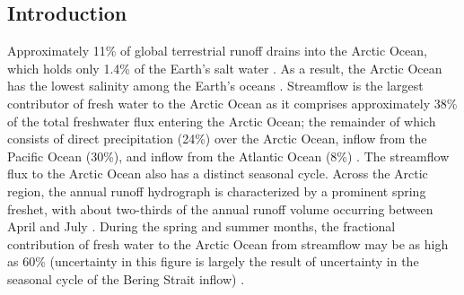 \documentclass[jgrga, draft]{agutex}
\begin{document}
%
%

%

\begin{article}

%
%

\section{Introduction}
\label{sec:intro}
Approximately 11\% of global terrestrial runoff drains into the Arctic Ocean, which holds only 1.4\% of the Earth's salt water \citep{Lewis_2000,Lammers_2001}.
As a result, the Arctic Ocean has the lowest salinity among the Earth's oceans \citep[e.g.][]{Steele_2001}.
Streamflow is the largest contributor of fresh water to the Arctic Ocean as it comprises approximately 38\% of the total freshwater flux entering the Arctic Ocean; the remainder of which consists of direct precipitation (24\%) over the Arctic Ocean, inflow from the Pacific Ocean (30\%), and inflow from the Atlantic Ocean (8\%) \citep{Serreze_2006}.
The streamflow flux to the Arctic Ocean also has a distinct seasonal cycle.
Across the Arctic region, the annual runoff hydrograph is characterized by a prominent spring freshet, with about two-thirds of the annual runoff volume occurring between April and July \citep{Lammers_2001}.
During the spring and summer months, the fractional contribution of fresh water to the Arctic Ocean from streamflow may be as high as 60\% (uncertainty in this figure is largely the result of uncertainty in the seasonal cycle of the Bering Strait inflow) \citep{Serreze_2006}.


\end{article}
\end{document}
